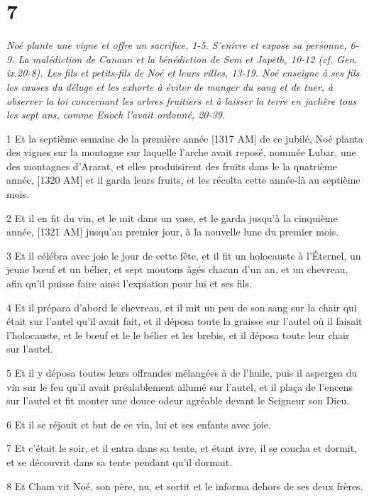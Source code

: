 \chapter{7}

\par \textit{Noé plante une vigne et offre un sacrifice, 1-5. S'enivre et expose sa personne, 6-9. La malédiction de Canaan et la bénédiction de Sem et Japeth, 10-12 (cf. Gen. ix.20-8). Les fils et petits-fils de Noé et leurs villes, 13-19. Noé enseigne à ses fils les causes du déluge et les exhorte à éviter de manger du sang et de tuer, à observer la loi concernant les arbres fruitiers et à laisser la terre en jachère tous les sept ans, comme Enoch l'avait ordonné, 20-39.}

\par 1 Et la septième semaine de la première année [1317 AM] de ce jubilé, Noé planta des vignes sur la montagne sur laquelle l'arche avait reposé, nommée Lubar, une des montagnes d'Ararat, et elles produisirent des fruits dans le la quatrième année, [1320 AM] et il garda leurs fruits, et les récolta cette année-là au septième mois.
\par 2 Et il en fit du vin, et le mit dans un vase, et le garda jusqu'à la cinquième année, [1321 AM] jusqu'au premier jour, à la nouvelle lune du premier mois.
\par 3 Et il célébra avec joie le jour de cette fête, et il fit un holocauste à l'Éternel, un jeune bœuf et un bélier, et sept moutons âgés chacun d'un an, et un chevreau, afin qu'il puisse faire ainsi l'expiation pour lui et ses fils.
\par 4 Et il prépara d'abord le chevreau, et il mit un peu de son sang sur la chair qui était sur l'autel qu'il avait fait, et il déposa toute la graisse sur l'autel où il faisait l'holocauste, et le bœuf et le le bélier et les brebis, et il déposa toute leur chair sur l'autel.
\par 5 Et il y déposa toutes leurs offrandes mélangées à de l'huile, puis il aspergea du vin sur le feu qu'il avait préalablement allumé sur l'autel, et il plaça de l'encens sur l'autel et fit monter une douce odeur agréable devant le Seigneur son Dieu.
\par 6 Et il se réjouit et but de ce vin, lui et ses enfants avec joie.
\par 7 Et c'était le soir, et il entra dans sa tente, et étant ivre, il se coucha et dormit, et se découvrit dans sa tente pendant qu'il dormait.
\par 8 Et Cham vit Noé, son père, nu, et sortit et le informa dehors de ses deux frères.
